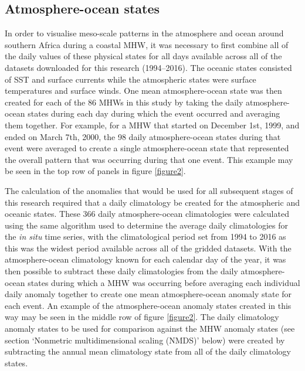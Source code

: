 \documentclass[utf8]{frontiersSCNS}
\begin{document}
\subsection{Atmosphere-ocean states}
In order to visualise meso-scale patterns in the atmosphere and ocean around southern Africa during a coastal MHW, it was necessary to first combine all of the daily values of these physical states for all days available across all of the datasets downloaded for this research (1994--2016). The oceanic states consisted of SST and surface currents while the atmospheric states were surface temperatures and surface winds. One mean atmosphere-ocean state was then created for each of the 86 MHWs in this study by taking the daily atmosphere-ocean states during each day during which the event occurred and averaging them together. For example, for a MHW that started on December 1st, 1999, and ended on March 7th, 2000, the 98 daily atmosphere-ocean states during that event were averaged to create a single atmosphere-ocean state that represented the overall pattern that was occurring during that one event. This example may be seen in the top row of panels in figure \ref{figure2}.

The calculation of the anomalies that would be used for all subsequent stages of this research required that a daily climatology be created for the atmospheric and oceanic states. These 366 daily atmosphere-ocean climatologies were calculated using the same algorithm used to determine the average daily climatologies for the \emph{in situ} time series, with the climatological period set from 1994 to 2016 as this was the widest period available across all of the gridded datasets. With the atmosphere-ocean climatology known for each calendar day of the year, it was then possible to subtract these daily climatologies from the daily atmosphere-ocean states during which a MHW was occurring before averaging each individual daily anomaly together to create one mean atmosphere-ocean anomaly state for each event. An example of the atmosphere-ocean anomaly states created in this way may be seen in the middle row of figure \ref{figure2}. The daily climatology anomaly states to be used for comparison against the MHW anomaly states (see section `Nonmetric multidimensional scaling (NMDS)' below) were created by subtracting the annual mean climatology state from all of the daily climatology states.


\end{document}
